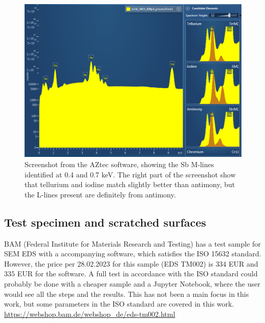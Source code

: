 \begin{figure}[htbp]
    \centering
    \includegraphics[width=0.95\linewidth]{figures/discussion/AZtec_Mlines.png}
    \caption{
        Screenshot from the AZtec software, showing the Sb M-lines identified at 0.4 and 0.7 keV.
        The right part of the screenshot show that tellurium and iodine match slightly better than antimony, but the L-lines present are definitely from antimony.
    }
    \label{fig:discussion:AZtec_Mlines}
\end{figure}





\subsection{Test specimen and scratched surfaces}
\label{discussion:test_specimen}



BAM (Federal Institute for Materials Research and Testing) has a test sample for SEM EDS with a accompanying software, which satisfies the ISO 15632 standard.
However, the price per 28.02.2023 for this sample (EDS TM002) is $334$ EUR and $335$ EUR for the software.
A full test in accordance with the ISO standard could probably be done with a cheaper sample and a Jupyter Notebook, where the user would see all the steps and the results.
This has not been a main focus in this work, but some parameters in the ISO standard are covered in this work.
\url{https://webshop.bam.de/webshop_de/eds-tm002.html}

